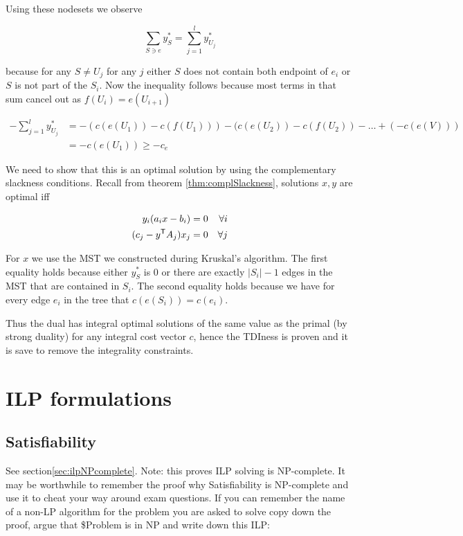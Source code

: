 Using these nodesets we observe

\[\sum_{S\ni e} y_S^* = \sum_{j=1}^l y_{U_j}^*\]

because for any $S\neq U_j$ for any $j$ either $S$ does not contain both endpoint of $e_i$ or $S$ is not part of the $S_i$. Now the inequality follows because most terms in that sum cancel out as $f(U_i)=e(U_{i+1})$

\begin{align*}
-\sum_{j=1}^l y_{U_j}^* &= -(c(e(U_1)) - c(f(U_1))) - (c(e(U_2)) - c(f(U_2)) - \ldots + (-c(e(V)))\\
	&=-c(e(U_1)) \geq -c_e
\end{align*}

We need to show that this is an optimal solution by using the complementary slackness conditions. Recall from theorem \ref{thm:complSlackness}, solutions $x,y$ are optimal iff

\begin{align*}
y_i(a_ix-b_i) = 0 && \forall i\\ 
(c_j - {y}^\text{\upshape \sffamily T}A_j)x_j =0 && \forall j
\end{align*}

For $x$ we use the MST we constructed during Kruskal's algorithm. The first equality holds because either $y_S^*$ is 0 or there are exactly $|S_i|-1$ edges in the MST that are contained in $S_i$. The second equality holds because we have for every edge $e_i$ in the tree that $c(e(S_i))=c(e_i)$.

Thus the dual has integral optimal solutions of the same value as the primal (by strong duality) for any integral cost vector $c$, hence the TDIness is proven and it is save to remove the integrality constraints.


\section{ILP formulations}

\subsection{Satisfiability}
See section\ref{sec:ilpNPcomplete}. Note: this proves ILP solving is NP-complete. It may be worthwhile to remember the proof why Satisfiability is NP-complete and use it to cheat your way around exam questions. If you can remember the name of a non-LP algorithm for the problem you are asked to solve copy down the proof, argue that \$Problem is in NP and write down this ILP:

